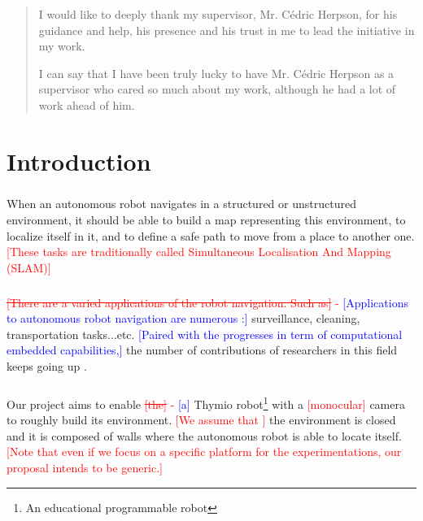 \documentclass[12pt]{report}
\newcommand{\hcp}[1]{\textcolor{blue}{[#1]}}
\newcommand{\hcr}[2]{\textcolor{red}{\sout{[#1]} - \textcolor{blue}{ [#2]}}}
\newcommand{\hc}[1]{\textcolor{red}{[#1]}}
\newenvironment{acknowledgements}[1]
{\renewcommand{\abstractname}{Acknowledgements}
\begin{abstract}}
{\end{abstract}}
\begin{document}
	
	\begin{acknowledgements}
	\centering
		
	
	I would like to deeply thank my supervisor, Mr. Cédric Herpson, for his guidance and help, his presence and his trust in me to lead the initiative in my work. 
	
	I can say that I have been truly lucky to have Mr. Cédric Herpson as a supervisor who cared so much about my work, although he had a lot of work ahead of him. 
	
	\end{acknowledgements}
		
	\tableofcontents
	\thispagestyle{empty}
	
	
	\setcounter{page}{0}
	
	\chapter*{Introduction}
	\paragraph{}
	When an autonomous robot navigates in a structured or unstructured environment, it should be able to build a map 
representing this environment, to localize itself in it, and to define a safe path to move from a place to another 
one.\hc{These tasks are traditionally called Simultaneous Localisation And Mapping (SLAM)}
	
	\paragraph{}
	\hcr{There are a varied applications of the robot 
navigation. Such as}{Applications to autonomous robot navigation are numerous :} surveillance, cleaning, transportation 
tasks...etc. \hcp{Paired with the progresses in term of computational embedded capabilities,} the number of 
contributions of researchers in this field keeps going up \cite{bonin-font_visual_2008}.
	
	\paragraph{}
	Our project aims to enable \hcr{the}{a} Thymio robot\footnote{An educational programmable robot} with a 
\hc{monocular} camera to roughly build its environment. \hc{We assume that } the environment is closed and it is 
composed of walls where the autonomous robot is able to locate itself. \hc{Note that even if we focus on a specific 
platform for the experimentations, our proposal intends to be generic.}
	
\end{document}
